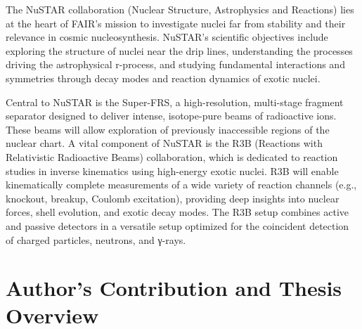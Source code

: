 \begin{itemize}
	The NuSTAR collaboration (Nuclear Structure, Astrophysics and Reactions) lies at the heart of FAIR’s mission to investigate nuclei far from stability and their relevance in cosmic nucleosynthesis. NuSTAR's scientific objectives include exploring the structure of nuclei near the drip lines, understanding the processes driving the astrophysical r-process, and studying fundamental interactions and symmetries through decay modes and reaction dynamics of exotic nuclei.
	
	Central to NuSTAR is the Super-FRS, a high-resolution, multi-stage fragment separator designed to deliver intense, isotope-pure beams of radioactive ions. These beams will allow exploration of previously inaccessible regions of the nuclear chart. A vital component of NuSTAR is the R3B (Reactions with Relativistic Radioactive Beams) collaboration, which is dedicated to reaction studies in inverse kinematics using high-energy exotic nuclei. R3B will enable kinematically complete measurements of a wide variety of reaction channels (e.g., knockout, breakup, Coulomb excitation), providing deep insights into nuclear forces, shell evolution, and exotic decay modes. The R3B setup combines active and passive detectors in a versatile setup optimized for the coincident detection of charged particles, neutrons, and γ-rays.
\end{itemize}




\section{Author's Contribution and Thesis Overview}
